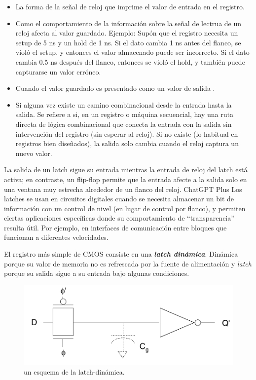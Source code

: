\begin{itemize}
    \item La forma de la señal de reloj que imprime el valor de entrada en el registro. 
    \item Como el comportamiento de la información sobre la señal de lectrua de un reloj afecta al valor guardado. Ejemplo: Supón que el registro necesita un setup de 5 ns y un hold de 1 ns. Si el dato cambia 1 ns antes del flanco, se violó el setup, y entonces el valor almacenado puede ser incorrecto. Si el dato cambia 0.5 ns después del flanco, entonces se violó el hold, y también puede capturarse un valor erróneo.
    \item Cuando el valor guardado es presentado como un valor de salida . 
    \item Si alguna vez existe un camino combinacional desde la entrada hasta la salida. Se refiere a si, en un registro o máquina secuencial, hay una ruta directa de lógica combinacional que conecta la entrada con la salida sin intervención del registro (sin esperar al reloj). Si no existe (lo habitual en registros bien diseñados), la salida solo cambia cuando el reloj captura un nuevo valor.
\end{itemize}
La salida de un latch sigue su entrada mientras la entrada de reloj del latch está activa; en contraste, un flip-flop permite que la entrada afecte a la salida solo en una ventana muy estrecha alrededor de un flanco del reloj. ChatGPT Plus Los latches se usan en circuitos digitales cuando se necesita almacenar un bit de información con un control de nivel (en lugar de control por flanco), y permiten ciertas aplicaciones específicas donde su comportamiento de “transparencia” resulta útil. Por ejemplo, en interfaces de comunicación entre bloques que funcionan a diferentes velocidades.

El registro más simple de CMOS consiste en una \textbf{\textit{latch dinámica}}. Dinámica porque su valor de memoria no es refrescada por la fuente de alimentación y \textit{latch} porque su salida sigue a su entrada bajo algunas condiciones.  

\begin{figure}[H] \centering
    \includegraphics[width=0.7\linewidth]{Imagenes/02/02-LatchDinamica.png}
    \caption{un esquema de la latch-dinámica.}
    \label{Fig:02-LatchDinamica}
\end{figure}

